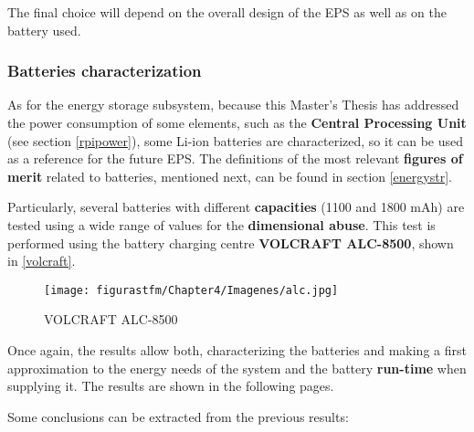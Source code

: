 The final choice will depend on the overall design of the \acrshort{EPS} as well as on the battery used.

\subsubsection{Batteries characterization} \label{battscharac}

As for the energy storage subsystem, because this Master's Thesis has addressed the power consumption of some elements, such as the \textbf{Central Processing Unit} (see section \ref{rpipower}), some Li-ion batteries are characterized, so it can be used as a reference for the future \acrshort{EPS}. The definitions of the most relevant \textbf{figures of merit} related to batteries, mentioned next, can be found in section \ref{energystr}.

Particularly, several batteries with different \textbf{capacities} (1100 and 1800 mAh) are tested using a wide range of values for the \textbf{dimensional abuse}. This test is performed using the battery charging centre \textbf{VOLCRAFT ALC-8500}, shown in \autoref{volcraft}.


\begin{figure}[H]
			\centering
			\texttt{[image: figurastfm/Chapter4/Imagenes/alc.jpg]}
			\caption{VOLCRAFT ALC-8500} \label{volcraft}
\end{figure}

Once again, the results allow both, characterizing the batteries and making a first approximation to the energy needs of the system and the battery \textbf{run-time} when supplying it.  The results are shown in the following pages.





Some conclusions can be extracted from the previous results:

